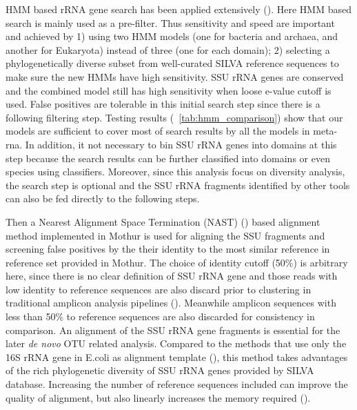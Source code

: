 \documentclass[12pt]{article}
\begin{document}
  HMM based rRNA gene search has been applied extensively (\cite{metarna,rrnaselector,metaxa}). Here HMM based search is mainly used as a pre-filter. Thus sensitivity and speed are important and achieved by 1) using two HMM models (one for bacteria and archaea, and another for Eukaryota) instead of three (one for each domain); 2) selecting a phylogenetically diverse subset from well-curated SILVA reference sequences to make sure the new HMMs have high sensitivity. SSU rRNA genes are conserved and the combined model still has high sensitivity when loose e-value cutoff is used. False positives are tolerable in this initial search step since there is a following filtering step. Testing results (~\ref{tab:hmm_comparison}) show that our models are sufficient to cover most of search results by all the models in meta-rna. In addition, it not necessary to bin SSU rRNA genes into domains at this step because the search results can be further classified into domains or even species using classifiers. Moreover, since this analysis focus on diversity analysis, the search step is optional and the SSU rRNA fragments identified by other tools can also be fed directly to the following steps.

    Then a Nearest Alignment Space Termination (NAST) (\cite{mothuraligner2009}) based alignment method implemented in Mothur is used for aligning the SSU fragments and screening false positives by the their identity to the most similar reference in reference set provided in Mothur. The choice of identity cutoff (50\%) is arbitrary here, since there is no clear definition of SSU rRNA gene and those reads with low identity to reference sequences are also discard prior to clustering in traditional amplicon analysis pipelines (\cite{rdp2009, mothur, qiime}). Meanwhile amplicon sequences with less than 50\% to reference sequences are also discarded for consistency in comparison. An alignment of the SSU rRNA gene fragments is essential for the later {\em de novo} OTU related analysis. Compared to the methods that use only the 16S rRNA gene in E.coli as alignment template (\cite{kostas2013}), this method takes advantages of the rich phylogenetic diversity of SSU rRNA genes provided by SILVA database. Increasing the number of reference sequences included can improve the quality of alignment, but also linearly increases the memory required (\cite{mothuraligner2009,pynast}).
\end{document}
